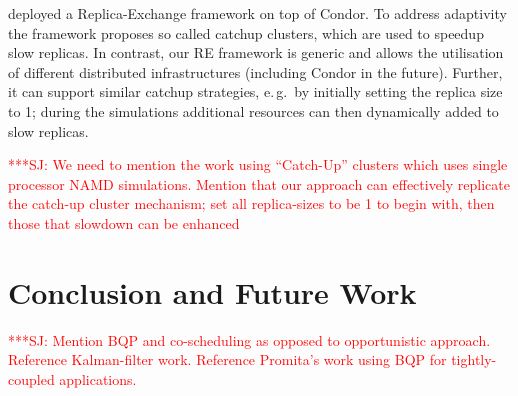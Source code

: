 \documentclass{rspublic}
\newcommand{\alnote}[1]{ {\textcolor{blue} { ***AL: #1 }}}
\newcommand{\jhanote}[1]{ {\textcolor{red} { ***SJ: #1 }}}
\newcommand{\alnote}[1]{}
\newcommand{\jhanote}[1]{}
\begin{document}
\cite{Woods:2005nx} deployed a Replica-Exchange framework on top of Condor. 
To address adaptivity the framework proposes so called catchup clusters,
which are used to speedup slow replicas. In contrast, our RE 
framework is generic and allows the utilisation of different distributed 
infrastructures (including Condor in the future). Further, it can support 
similar catchup strategies, e.\,g.\ by initially setting
the replica size  to 1; during the simulations additional resources 
can then dynamically added to slow replicas. 

\jhanote{We need to mention the work using ``Catch-Up'' clusters which
  uses single processor NAMD simulations. Mention that our approach
  can effectively replicate the catch-up cluster mechanism; set all
  replica-sizes to be 1 to begin with, then those that slowdown can
  be enhanced}



\section{Conclusion and Future Work}

\jhanote{Mention BQP and co-scheduling as opposed to opportunistic
  approach. Reference Kalman-filter work. Reference Promita's work
  using BQP for tightly-coupled applications.} 
                
\end{document}
